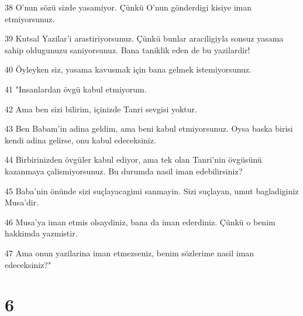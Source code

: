 \par 38 O'nun sözü sizde yasamiyor. Çünkü O'nun gönderdigi kisiye iman etmiyorsunuz.
\par 39 Kutsal Yazilar'i arastiriyorsunuz. Çünkü bunlar araciligiyla sonsuz yasama sahip oldugunuzu saniyorsunuz. Bana taniklik eden de bu yazilardir!
\par 40 Öyleyken siz, yasama kavusmak için bana gelmek istemiyorsunuz.
\par 41 "Insanlardan övgü kabul etmiyorum.
\par 42 Ama ben sizi bilirim, içinizde Tanri sevgisi yoktur.
\par 43 Ben Babam'in adina geldim, ama beni kabul etmiyorsunuz. Oysa baska birisi kendi adina gelirse, onu kabul edeceksiniz.
\par 44 Birbirinizden övgüler kabul ediyor, ama tek olan Tanri'nin övgüsünü kazanmaya çalismiyorsunuz. Bu durumda nasil iman edebilirsiniz?
\par 45 Baba'nin önünde sizi suçlayacagimi sanmayin. Sizi suçlayan, umut bagladiginiz Musa'dir.
\par 46 Musa'ya iman etmis olsaydiniz, bana da iman ederdiniz. Çünkü o benim hakkimda yazmistir.
\par 47 Ama onun yazilarina iman etmezseniz, benim sözlerime nasil iman edeceksiniz?"

\chapter{6}

